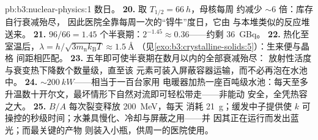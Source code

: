 \begin{solution}{pb:b3:nuclear-physics:1}
数日。
\textbf{20.} 取 $T_{1/2} = \qty{66}{h}$，母核每周
约减少 ${\sim}6$ 倍：库存自行衰减殆尽，
因此医院全靠每周一次的“锝牛”度日，它由
与本堆类似的反应堆送来。
\textbf{21.} $96/66 = 1.45$ 个半衰期：$2^{-1.45} \approx
0.36$——约剩 \qty{36}{GBq}。
\textbf{22.} 热化至室温后，$\lambda =
h/\sqrt{3m_{\text{n}}k_{\text{B}}T} \approx \qty{1.5}{\angstrom}$
（见\cref{exo:b3:crystalline-solids:5}）：生来便与晶格
间距相匹配。
\textbf{23.} 五年即可使半衰期在数月以内的全部衰减殆尽：
放射性活度与衰变热下降数个数量级，直至该
元素可装入屏蔽容器运输，而不必再泡在水池中。
\textbf{24.} ${\sim}\qty{200}{kW}$——相当于一百台家用
电暖器加热一座百吨级水池：每天至多
升温数十开尔文，最坏情形下自然对流即可轻松带走——非能动
安全，全凭热容之大。
\textbf{25.} $B/A$ 每次裂变释放 \qty{200}{MeV}，每天
消耗 \qty{21}{g}；缓发中子提供使 $k$
可操控的秒级时间；水兼具慢化、冷却与屏蔽之用——并
因其正在运行而发出蓝光；而最关键的产物
则装入小瓶，供周一的医院使用。
\end{solution}
